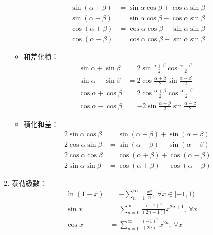 \begin{enumerate}
\begin{itemize}
\begin{subequations}
                \begin{align}
                    \sin(\alpha + \beta) & = \sin\alpha\cos\beta + \cos\alpha\sin\beta \\
                    \sin(\alpha - \beta) & = \sin\alpha\cos\beta - \cos\alpha\sin\beta \\
                    \cos(\alpha + \beta) & = \cos\alpha\cos\beta - \sin\alpha\sin\beta \\
                    \cos(\alpha - \beta) & = \cos\alpha\cos\beta + \sin\alpha\sin\beta
                \end{align}
            \end{subequations}
        \item 和差化積： \begin{subequations}
            \begin{align}
                \sin\alpha + \sin\beta & = 2\sin\frac{\alpha + \beta}{2}\cos\frac{\alpha - \beta}{2} \\
                \sin\alpha - \sin\beta & = 2\cos\frac{\alpha + \beta}{2}\sin\frac{\alpha - \beta}{2} \\
                \cos\alpha + \cos\beta & = 2\cos\frac{\alpha + \beta}{2}\cos\frac{\alpha - \beta}{2} \\
                \cos\alpha - \cos\beta & = -2\sin\frac{\alpha + \beta}{2}\sin\frac{\alpha - \beta}{2}
            \end{align}
        \end{subequations}
        \item 積化和差： \begin{subequations}
            \begin{align}
                2\sin\alpha\cos\beta & = \sin(\alpha + \beta) + \sin(\alpha - \beta) \\
                2\cos\alpha\sin\beta & = \sin(\alpha + \beta) - \sin(\alpha - \beta) \\
                2\cos\alpha\cos\beta & = \cos(\alpha + \beta) + \cos(\alpha - \beta) \\
                2\sin\alpha\sin\beta & = \cos(\alpha + \beta) - \cos(\alpha - \beta)
            \end{align}
        \end{subequations}
    \end{itemize}
    \item 泰勒級數：\begin{subequations}
        \begin{align}
            \ln(1 - x) & = -\sum_{n = 1}^{\infty}\frac{x^n}{n}, \ \forall x \in [-1, 1) \\
            \sin x & = \sum_{n = 0}^{\infty}\frac{(-1)^n}{(2n + 1)!}x^{2n + 1}, \ \forall x \\
            \cos x & = \sum_{n = 0}^{\infty}\frac{(-1)^n}{(2n)!}x^{2n}, \ \forall x
        \end{align}
    \end{subequations}
\end{enumerate}

\pagebreak